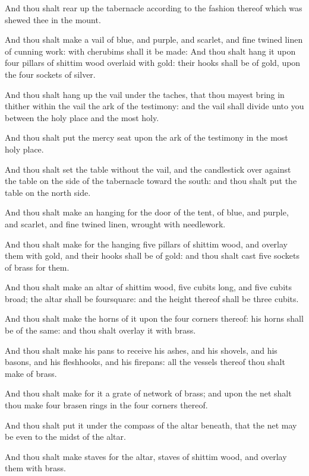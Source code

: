 \Verse And thou shalt rear up the tabernacle according to the fashion thereof which was shewed thee in the mount.

\Verse And thou shalt make a vail of blue, and purple, and scarlet, and fine twined linen of cunning work: with cherubims shall it be made: \Verse And thou shalt hang it upon four pillars of shittim wood overlaid with gold: their hooks shall be of gold, upon the four sockets of silver.

\Verse And thou shalt hang up the vail under the taches, that thou mayest bring in thither within the vail the ark of the testimony: and the vail shall divide unto you between the holy place and the most holy.

\Verse And thou shalt put the mercy seat upon the ark of the testimony in the most holy place.

\Verse And thou shalt set the table without the vail, and the candlestick over against the table on the side of the tabernacle toward the south: and thou shalt put the table on the north side.

\Verse And thou shalt make an hanging for the door of the tent, of blue, and purple, and scarlet, and fine twined linen, wrought with needlework.

\Verse And thou shalt make for the hanging five pillars of shittim wood, and overlay them with gold, and their hooks shall be of gold: and thou shalt cast five sockets of brass for them.

\Chapter
\Verse And thou shalt make an altar of shittim wood, five cubits long, and five cubits broad; the altar shall be foursquare: and the height thereof shall be three cubits.

\Verse And thou shalt make the horns of it upon the four corners thereof: his horns shall be of the same: and thou shalt overlay it with brass.

\Verse And thou shalt make his pans to receive his ashes, and his shovels, and his basons, and his fleshhooks, and his firepans: all the vessels thereof thou shalt make of brass.

\Verse And thou shalt make for it a grate of network of brass; and upon the net shalt thou make four brasen rings in the four corners thereof.

\Verse And thou shalt put it under the compass of the altar beneath, that the net may be even to the midst of the altar.

\Verse And thou shalt make staves for the altar, staves of shittim wood, and overlay them with brass.

